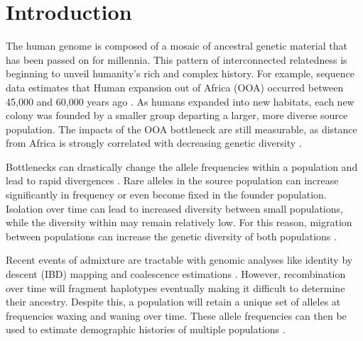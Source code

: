 \documentclass[
11pt, %
oneside, %
english, %
doublespacing, %
headsepline, %
chapterinoneline, %
]{MastersDoctoralThesis} %
\begin{document}

\mainmatter %
\pagestyle{thesis} %

	
\section{Introduction}
The human genome is composed of a mosaic of ancestral genetic material that has been passed on for millennia.
This pattern of interconnected relatedness is beginning to unveil humanity's rich and complex history.
For example, sequence data estimates that Human expansion out of Africa (OOA) occurred between 45,000 and 60,000 years ago \citep{Henn2012}. 
As humans expanded into new habitats, each new colony was founded by a smaller group departing a larger, more diverse source population.
The impacts of the OOA bottleneck are still measurable, as distance from Africa is strongly correlated with decreasing genetic diversity \citep{Ramachandran2005}.

Bottlenecks can drastically change the allele frequencies within a population and lead to rapid divergences \citep{Rosenberg2002, Charlesworth2003, Balick2015}.
Rare alleles in the source population can increase significantly in frequency or even become fixed in the founder population.
Isolation over time can lead to increased diversity between small populations, while the diversity within may remain relatively low. 
For this reason, migration between populations can increase the genetic diversity of both populations \citep{Charlesworth2003}.

Recent events of admixture are tractable with genomic analyses like identity by descent (IBD) mapping and coalescence estimations \citep{Baharian2016}.
However, recombination over time will fragment haplotypes eventually making it difficult to determine their ancestry.
Despite this, a population will retain a unique set of alleles at frequencies waxing and waning over time.
These allele frequencies can then be used to estimate demographic histories of multiple populations \citep{Gravel2011}. 
\end{document}

